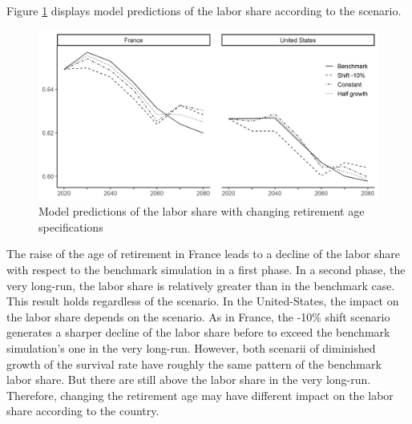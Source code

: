 Figure \ref{fig:retage_ls} displays model predictions of the labor share according to the scenario.
\begin{figure}[tb]
	\centering
	\includegraphics[width=1\linewidth]{../result/retirement/retage_ls.png}
	\caption{Model predictions of the labor share with changing retirement age specifications}
	\label{fig:retage_ls}
\end{figure}
The raise of the age of retirement in France leads to a decline of the labor share with respect to the benchmark simulation in a first phase. In a second phase, the very long-run, the labor share is relatively greater than in the benchmark case. This result holds regardless of the scenario. In the United-States, the impact on the labor share depends on the scenario. As in France, the -10\% shift scenario generates a sharper decline of the labor share before to exceed the benchmark simulation's one in the very long-run. However, both scenarii of diminished growth of the survival rate have roughly the same pattern of the benchmark labor share. But there are still above the labor share in the very long-run. Therefore, changing the retirement age may have different impact on the labor share according to the country.

